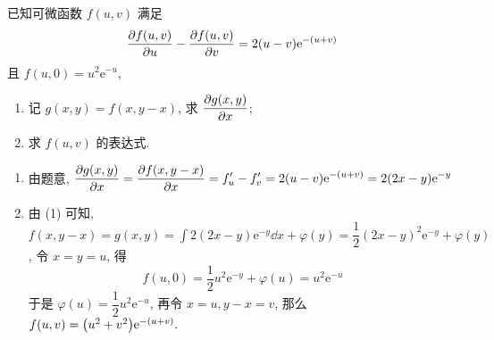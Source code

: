 \begin{example}
    已知可微函数 $f(u,v)$ 满足 $$\pdv{f(u,v)}{u}-\pdv{f(u,v)}{v}=2(u-v)\mathrm{e}^{-(u+v)}$$
    且 $f(u,0)=u^2\mathrm{e}^{-u}$, 
    \begin{enumerate}[label=(\arabic{*})]
        \item 记 $g(x,y)=f(x,y-x)$, 求 $\displaystyle\pdv{g(x,y)}{x}$;
        \item 求 $f(u,v)$ 的表达式.
    \end{enumerate}
\end{example}
\begin{solution}
    \begin{enumerate}[label=(\arabic{*})]
        \item 由题意, $\displaystyle\pdv{g(x,y)}{x}=\pdv{f(x,y-x)}{x}=f'_u-f'_v=2(u-v)\mathrm{e}^{-(u+v)}=2(2x-y)\mathrm{e}^{-y}$
        \item 由 (1) 可知, $\displaystyle f(x,y-x)=g(x,y)=\int 2(2x-y)\mathrm{e}^{-y}\dd x+\varphi(y)=\dfrac{1}{2}(2x-y)^2\mathrm{e}^{-y}+\varphi(y)$, 令 $x=y=u$, 得
              $$f(u,0)=\dfrac{1}{2}u^2\mathrm{e}^{-y}+\varphi(u)=u^2\mathrm{e}^{-u}$$
              于是 $\varphi(u)=\dfrac{1}{2}u^2\mathrm{e}^{-u}$, 再令 $x=u,y-x=v$, 那么 $f(u,v)=\qty(u^2+v^2)\mathrm{e}^{-(u+v)}.$
    \end{enumerate}
\end{solution}

